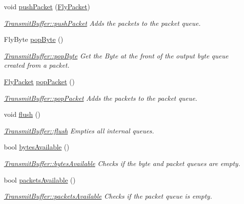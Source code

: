 \begin{DoxyCompactItemize}
void \hyperlink{class_transmit_buffer_a002757b58f4227167db20c8977bbdb28}{push\+Packet} (\hyperlink{class_fly_packet}{Fly\+Packet})
\begin{DoxyCompactList}\small\item\em \hyperlink{class_transmit_buffer_a002757b58f4227167db20c8977bbdb28}{Transmit\+Buffer\+::push\+Packet} Adds the packets to the packet queue. \end{DoxyCompactList}\item 
Fly\+Byte \hyperlink{class_transmit_buffer_a6da9417079dd783d996af8fcc138149c}{pop\+Byte} ()
\begin{DoxyCompactList}\small\item\em \hyperlink{class_transmit_buffer_a6da9417079dd783d996af8fcc138149c}{Transmit\+Buffer\+::pop\+Byte} Get the Byte at the front of the output byte queue created from a packet. \end{DoxyCompactList}\item 
\hyperlink{class_fly_packet}{Fly\+Packet} \hyperlink{class_transmit_buffer_add84c61a7f2f060d236feab584babc64}{pop\+Packet} ()
\begin{DoxyCompactList}\small\item\em \hyperlink{class_transmit_buffer_add84c61a7f2f060d236feab584babc64}{Transmit\+Buffer\+::pop\+Packet} Adds the packets to the packet queue. \end{DoxyCompactList}\item 
\hypertarget{class_transmit_buffer_a574f5ab5eca07b5ee8a517812cd7d87a}{}\label{class_transmit_buffer_a574f5ab5eca07b5ee8a517812cd7d87a} 
void \hyperlink{class_transmit_buffer_a574f5ab5eca07b5ee8a517812cd7d87a}{flush} ()
\begin{DoxyCompactList}\small\item\em \hyperlink{class_transmit_buffer_a574f5ab5eca07b5ee8a517812cd7d87a}{Transmit\+Buffer\+::flush} Empties all internal queues. \end{DoxyCompactList}\item 
bool \hyperlink{class_transmit_buffer_aec08c2e6aa511bfd87d83ec4226b2c8e}{bytes\+Available} ()
\begin{DoxyCompactList}\small\item\em \hyperlink{class_transmit_buffer_aec08c2e6aa511bfd87d83ec4226b2c8e}{Transmit\+Buffer\+::bytes\+Available} Checks if the byte and packet queues are empty. \end{DoxyCompactList}\item 
bool \hyperlink{class_transmit_buffer_aad9976b2ae40b1405a319de979b09827}{packets\+Available} ()
\begin{DoxyCompactList}\small\item\em \hyperlink{class_transmit_buffer_aad9976b2ae40b1405a319de979b09827}{Transmit\+Buffer\+::packets\+Available} Checks if the packet queue is empty. \end{DoxyCompactList}\end{DoxyCompactItemize}


